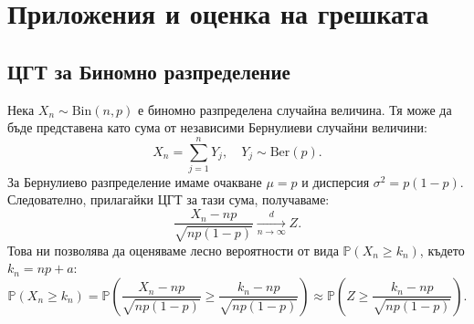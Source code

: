\documentclass{article}
\begin{document}
\section{Приложения и оценка на грешката}

\subsection{ЦГТ за Биномно разпределение}
Нека $X_n \sim \text{Bin}(n, p)$ е биномно разпределена случайна величина. Тя може да бъде представена като сума от независими Бернулиеви случайни величини:
\[ X_n = \sum_{j=1}^n Y_j, \quad Y_j \sim \text{Ber}(p). \]
За Бернулиево разпределение имаме очакване $\mu = p$ и дисперсия $\sigma^2 = p(1-p)$. Следователно, прилагайки ЦГТ за тази сума, получаваме:
\[ \frac{X_n - np}{\sqrt{np(1-p)}} \xrightarrow[n \to \infty]{d} Z. \]
Това ни позволява да оценяваме лесно вероятности от вида $\mathbb{P}(X_n \ge k_n)$, където $k_n = np + a$:
\[ \mathbb{P}(X_n \ge k_n) = \mathbb{P}\left( \frac{X_n - np}{\sqrt{np(1-p)}} \ge \frac{k_n - np}{\sqrt{np(1-p)}} \right) \approx \mathbb{P}\left( Z \ge \frac{k_n - np}{\sqrt{np(1-p)}} \right). \]
\end{document}
